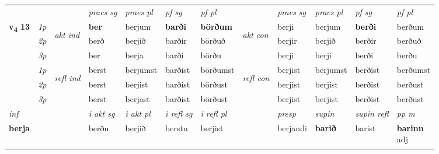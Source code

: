 \begin{longtable}[l]{X>{\footnotesize\itshape}llXXXXlXXXX}
 & &   & \textit{praes sg}  & \textit{praes pl}    & \textit{ pf sg} & \textit{pf pl} & & \textit{praes sg}  & \textit{praes pl}    & \textit{pf sg} & \textit{pf pl }  \\ \cmidrule{4-7} \cmidrule{9-12}
 \multirow{2}{*}{{{\textbf{v{\textsubscript{4}}} \Large{\textbf{13}}}}}  & 1p & \multirow{3}{*}{\begin{turn}{90}\textit{akt ind}\end{turn}} & \textbf{ber} & berjum & \textbf{barði} & \textbf{börðum} & \multirow{3}{*}{\begin{turn}{90}\textit{akt con}\end{turn}} &berji & berjum & \textbf{berði} & berðum\\*
 & 2p &  &  berð  & berjið & barðir & börðuð & & berjir & berjið & berðir & berðuð \\*
 & 3p &  & ber & berja & barði & börðu & & berji & berji& berði & berðu \\*
\cmidrule{4-7} \cmidrule{9-12}
 & 1p & \multirow{3}{*}{\begin{turn}{90}\textit{refl ind}\end{turn}}  & berst & berjumst & barðist & börðumst & \multirow{3}{*}{\begin{turn}{90}\textit{refl con}\end{turn}}  &berjist & berjumst & berðist & berðumst \\*
 & 2p &  & berst & berjist & barðist & börðust & &berjist & berjist & berðist & berðust \\*
 & 3p  & & berst & berjast & barðist & börðust & & berjist & berjist& berðist & berðust \\*
\cmidrule{4-7} \cmidrule{9-12}

   {\textit{inf}} & &  & \textit{i akt sg} & \textit{i akt pl} & \textit{i refl sg} & \textit{i refl pl} && \textit{presp} & \textit{supin} & \textit{supin refl} & \textit{pp m} \\*
  {\textbf{berja}} & && berðu  & berjið & berstu & berjist && berjandi &  \textbf{barið} & barist & \specialcell{\textbf{barinn} \\ adj\textbf{\textsubscript{}}} \\*

\midrule


\end{longtable}
